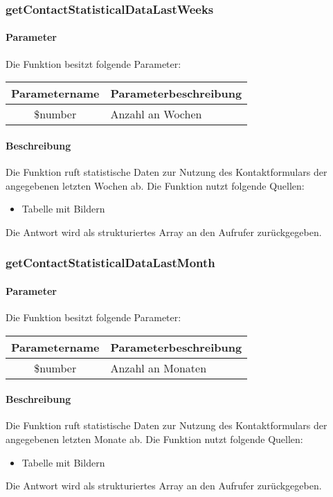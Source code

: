 \subsubsection{getContactStatisticalDataLastWeeks}
\paragraph{Parameter} Die Funktion besitzt folgende Parameter:
\begin{table}[H]
	\begin{tabular}{|c|p{11cm}|}
		\hline
		\textbf{Parametername} & \textbf{Parameterbeschreibung} \\ \hline
		\$number & Anzahl an Wochen \\ \hline
	\end{tabular}
\end{table}
\paragraph{Beschreibung} Die Funktion ruft statistische Daten zur Nutzung des Kontaktformulars der angegebenen letzten Wochen ab. Die Funktion nutzt folgende Quellen:
\begin{itemize}
	\item Tabelle mit Bildern
\end{itemize}
Die Antwort wird als strukturiertes Array an den Aufrufer zurückgegeben.
\subsubsection{getContactStatisticalDataLastMonth}
\paragraph{Parameter} Die Funktion besitzt folgende Parameter:
\begin{table}[H]
	\begin{tabular}{|c|p{11cm}|}
		\hline
		\textbf{Parametername} & \textbf{Parameterbeschreibung} \\ \hline
		\$number & Anzahl an Monaten \\ \hline
	\end{tabular}
\end{table}
\paragraph{Beschreibung} Die Funktion ruft statistische Daten zur Nutzung des Kontaktformulars der angegebenen letzten Monate ab. Die Funktion nutzt folgende Quellen:
\begin{itemize}
	\item Tabelle mit Bildern
\end{itemize}
Die Antwort wird als strukturiertes Array an den Aufrufer zurückgegeben.
